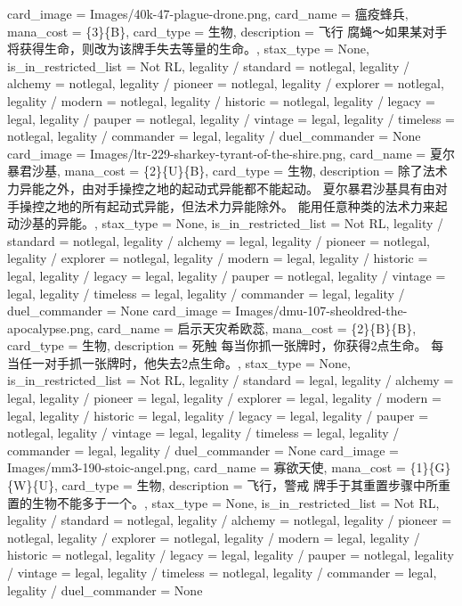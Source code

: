 \documentclass[lang = cn, color = black, 10pt]{AllThatStax}
\begin{document}
\card
{
	card_image = Images/40k-47-plague-drone.png,
	card_name = 瘟疫蜂兵,
	mana_cost = \{3\}\{B\},
	card_type = 生物,
	description = 飞行
	腐蝇～如果某对手将获得生命，则改为该牌手失去等量的生命。,
	stax_type = None,
	is_in_restricted_list = Not RL,
	legality / standard = notlegal,
	legality / alchemy = notlegal,
	legality / pioneer = notlegal,
	legality / explorer = notlegal,
	legality / modern = notlegal,
	legality / historic = notlegal,
	legality / legacy = legal,
	legality / pauper = notlegal,
	legality / vintage = legal,
	legality / timeless = notlegal,
	legality / commander = legal,
	legality / duel_commander = None
}
\card
{
	card_image = Images/ltr-229-sharkey-tyrant-of-the-shire.png,
	card_name = 夏尔暴君沙基,
	mana_cost = \{2\}\{U\}\{B\},
	card_type = 生物,
	description = 除了法术力异能之外，由对手操控之地的起动式异能都不能起动。
	夏尔暴君沙基具有由对手操控之地的所有起动式异能，但法术力异能除外。
	能用任意种类的法术力来起动沙基的异能。,
	stax_type = None,
	is_in_restricted_list = Not RL,
	legality / standard = notlegal,
	legality / alchemy = legal,
	legality / pioneer = notlegal,
	legality / explorer = notlegal,
	legality / modern = legal,
	legality / historic = legal,
	legality / legacy = legal,
	legality / pauper = notlegal,
	legality / vintage = legal,
	legality / timeless = legal,
	legality / commander = legal,
	legality / duel_commander = None
}
\card
{
	card_image = Images/dmu-107-sheoldred-the-apocalypse.png,
	card_name = 启示天灾希欧蕊,
	mana_cost = \{2\}\{B\}\{B\},
	card_type = 生物,
	description = 死触
	每当你抓一张牌时，你获得2点生命。
	每当任一对手抓一张牌时，他失去2点生命。,
	stax_type = None,
	is_in_restricted_list = Not RL,
	legality / standard = legal,
	legality / alchemy = legal,
	legality / pioneer = legal,
	legality / explorer = legal,
	legality / modern = legal,
	legality / historic = legal,
	legality / legacy = legal,
	legality / pauper = notlegal,
	legality / vintage = legal,
	legality / timeless = legal,
	legality / commander = legal,
	legality / duel_commander = None
}
\card
{
	card_image = Images/mm3-190-stoic-angel.png,
	card_name = 寡欲天使,
	mana_cost = \{1\}\{G\}\{W\}\{U\},
	card_type = 生物,
	description = 飞行，警戒
	牌手于其重置步骤中所重置的生物不能多于一个。,
	stax_type = None,
	is_in_restricted_list = Not RL,
	legality / standard = notlegal,
	legality / alchemy = notlegal,
	legality / pioneer = notlegal,
	legality / explorer = notlegal,
	legality / modern = legal,
	legality / historic = notlegal,
	legality / legacy = legal,
	legality / pauper = notlegal,
	legality / vintage = legal,
	legality / timeless = notlegal,
	legality / commander = legal,
	legality / duel_commander = None
}
\end{document}
